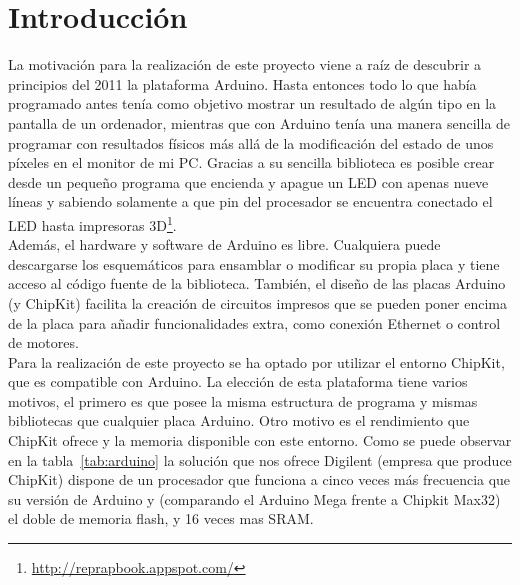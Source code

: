 

\section{Introducción}
La motivación para la realización de este proyecto viene a raíz de descubrir a principios del 2011 la plataforma Arduino. Hasta entonces todo lo que había programado antes tenía como objetivo mostrar un resultado de algún tipo en la pantalla de un ordenador, mientras que con Arduino tenía una manera sencilla de programar con resultados físicos más allá de la modificación del estado de unos píxeles en el monitor de mi PC. Gracias a su sencilla biblioteca es posible crear desde un pequeño programa que encienda y apague un LED con apenas nueve líneas y sabiendo solamente a que pin del procesador se encuentra conectado el LED hasta impresoras 3D\footnote{\url{http://reprapbook.appspot.com/}}.\\

Además, el hardware y software de Arduino es libre. Cualquiera puede descargarse los esquemáticos para ensamblar o modificar su propia placa y tiene acceso al código fuente de la biblioteca. También, el diseño de las placas Arduino (y ChipKit) facilita la creación de circuitos impresos que se pueden poner encima de la placa para añadir funcionalidades extra, como conexión Ethernet o control de motores.\\

Para la realización de este proyecto se ha optado por utilizar el entorno ChipKit, que es compatible con Arduino. La elección de esta plataforma tiene varios motivos, el primero es que posee la misma estructura de programa y mismas bibliotecas que cualquier placa Arduino. Otro motivo es el rendimiento que ChipKit ofrece y la memoria disponible con este entorno. Como se puede observar en la tabla~\ref{tab:arduino} la solución que nos ofrece Digilent (empresa que produce ChipKit) dispone de un procesador que funciona a cinco veces más frecuencia que su versión de Arduino y (comparando el Arduino Mega frente a Chipkit Max32) el doble de memoria flash, y 16 veces mas SRAM.

